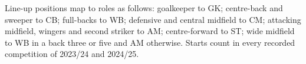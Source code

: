 \begin{apptable}
\label{tab:scoreparts}
\end{apptable}

Line-up positions map to roles as follows: goalkeeper to GK; centre-back and sweeper to CB; full-backs to WB; defensive and central midfield to CM; attacking midfield, wingers and second striker to AM; centre-forward to ST; wide midfield to WB in a back three or five and AM otherwise. Starts count in every recorded competition of 2023/24 and 2024/25.

\FloatBarrier
